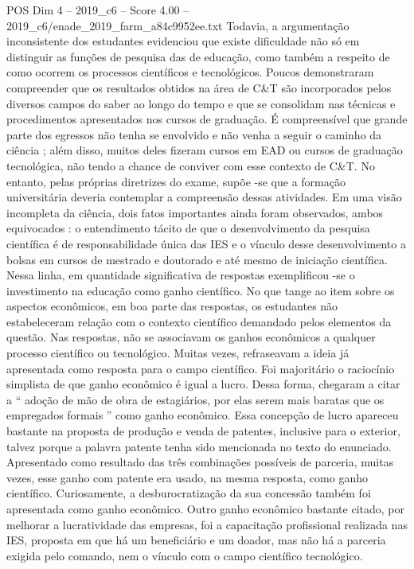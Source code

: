 \begin{textsample}{POS Dim 4 – 2019\_c6 – Score 4.00 – 2019\_c6/enade\_2019\_farm\_a84c9952ee.txt}
Todavia, a argumentação inconsistente dos estudantes evidenciou que existe dificuldade não só em distinguir as funções de pesquisa das de educação, como também a respeito de como ocorrem os processos científicos e tecnológicos.
Poucos demonstraram compreender que os resultados obtidos na área de C\&T são incorporados pelos diversos campos do saber ao longo do tempo e que se consolidam nas técnicas e procedimentos apresentados nos cursos de graduação.
É compreensível que grande parte dos egressos não tenha se envolvido e não venha a seguir o caminho da ciência ; além disso, muitos deles fizeram cursos em EAD ou cursos de graduação tecnológica, não tendo a chance de conviver com esse contexto de C\&T.
No entanto, pelas próprias diretrizes do exame, supõe -se que a formação universitária deveria contemplar a compreensão dessas atividades.
Em uma visão incompleta da ciência, dois fatos importantes ainda foram observados, ambos equivocados : o entendimento tácito de que o desenvolvimento da pesquisa científica é de responsabilidade única das IES e o vínculo desse desenvolvimento a bolsas em cursos de mestrado e doutorado e até mesmo de iniciação científica.
Nessa linha, em quantidade significativa de respostas exemplificou -se o investimento na educação como ganho científico.
No que tange ao item sobre os aspectos econômicos, em boa parte das respostas, os estudantes não estabeleceram relação com o contexto científico demandado pelos elementos da questão.
Nas respostas, não se associavam os ganhos econômicos a qualquer processo científico ou tecnológico.
Muitas vezes, refraseavam a ideia já apresentada como resposta para o campo científico.
Foi majoritário o raciocínio simplista de que ganho econômico é igual a lucro.
Dessa forma, chegaram a citar a “ adoção de mão de obra de estagiários, por elas serem mais baratas que os empregados formais ” como ganho econômico.
Essa concepção de lucro apareceu bastante na proposta de produção e venda de patentes, inclusive para o exterior, talvez porque a palavra patente tenha sido mencionada no texto do enunciado.
Apresentado como resultado das três combinações possíveis de parceria, muitas vezes, esse ganho com patente era usado, na mesma resposta, como ganho científico.
Curiosamente, a desburocratização da sua concessão também foi apresentada como ganho econômico.
Outro ganho econômico bastante citado, por melhorar a lucratividade das empresas, foi a capacitação profissional realizada nas IES, proposta em que há um beneficiário e um doador, mas não há a parceria exigida pelo comando, nem o vínculo com o campo científico tecnológico.

\end{textsample}
